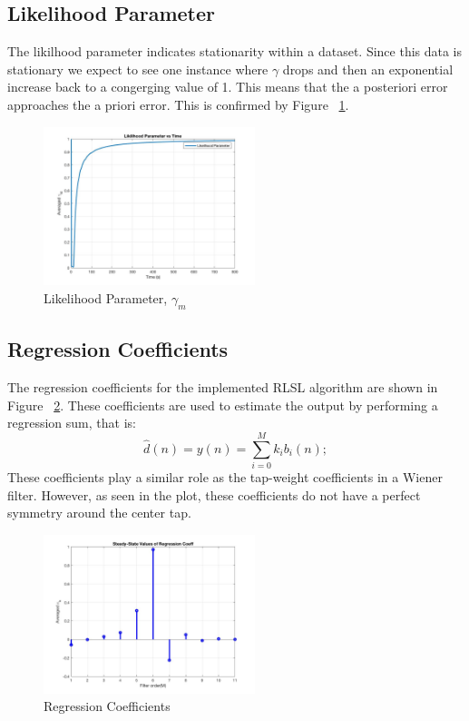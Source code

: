 \documentclass[journal]{IEEEtran}
\begin{document}
\subsection{Likelihood Parameter}
The likilhood parameter indicates stationarity within a dataset. Since this data is
stationary we expect to see one instance where $\gamma$ drops and then an exponential
increase back to a congerging value of 1. This means that the a posteriori error approaches the a priori error.
This is confirmed by Figure ~\ref{fig:likelihood}.
\begin{figure}[H]
  \centering
  \captionsetup{justification=centering,font = small}
  \includegraphics[width=0.55\textwidth, inner] {Plots/Project3_LIKLIHOOD.jpg}
  \caption{Likelihood Parameter, $\gamma_m$}
    \label{fig:likelihood}
\end{figure}
\subsection{Regression Coefficients}
The regression coefficients for the implemented RLSL algorithm are shown in Figure ~\ref{fig:regcoeff}.
These coefficients are used to estimate the output by performing a regression sum, that is:
\begin{equation}
  \label{eq:regsum}
  \hat{d}(n)= y(n) = \sum_{i=0}^{M}k_ib_i(n);
\end{equation}
These coefficients play a similar role as the tap-weight coefficients in a Wiener filter. However, as seen in
the plot, these coefficients do not have a perfect symmetry around the center tap.
\begin{figure}[H]
  \centering
  \captionsetup{justification=centering,font = small}
  \includegraphics[width=0.55\textwidth, inner] {Plots/Project3_STEM.jpg}
  \caption{Regression Coefficients}
    \label{fig:regcoeff}
\end{figure}
\end{document}

